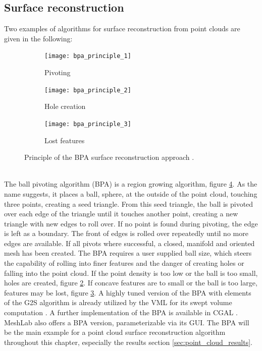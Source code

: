 \subsection{Surface reconstruction}
\label{sec:point_cloud_reconstruction}

Two examples of algorithms for surface reconstruction from point clouds are given in the following:

\begin{description}
	\begin{figure}
		\centering
		\begin{subfigure}[b]{0.30\textwidth}
			\centering
			\texttt{[image: bpa\_principle\_1]}
			\caption{
				Pivoting
			}
			\label{fig:bpa_principle_1}
		\end{subfigure}
		\begin{subfigure}[b]{0.30\textwidth}
			\centering
			\texttt{[image: bpa\_principle\_2]}
			\caption{
				Hole creation
			}
			\label{fig:bpa_principle_2}
		\end{subfigure}
		\begin{subfigure}[b]{0.30\textwidth}
			\centering
			\texttt{[image: bpa\_principle\_3]}
			\caption{
				Lost features
			}
			\label{fig:bpa_principle_3}
		\end{subfigure}
		\caption{
			Principle of the BPA surface reconstruction approach \cite{bpa}.
		}
		\label{fig:bpa_principle}
	\end{figure}

	\item[Ball pivoting algorithm] \hfill \\
	The ball pivoting algorithm (BPA) is a region growing algorithm, \cf figure \ref{fig:bpa_principle}.
	As the name suggests, it places a ball, \ie sphere, at the outside of the point cloud, touching three points, creating a seed triangle.
	From this seed triangle, the ball is pivoted over each edge of the triangle until it touches another point, creating a new triangle with new edges to roll over.
	If no point is found during pivoting, the edge is left as a boundary.
	The front of edges is rolled over repeatedly until no more edges are available.
	If all pivots where successful, a closed, manifold and oriented mesh has been created.
	The BPA requires a user supplied ball size, which steers the capability of rolling into finer features and the danger of creating holes or falling into the point cloud.
	If the point density is too low or the ball is too small, holes are created, \cf figure \ref{fig:bpa_principle_2}.
	If concave features are to small or the ball is too large, features may be lost, \cf figure \ref{fig:bpa_principle_3}.
	A highly tuned version of the BPA with elements of the G2S algorithm is already utilized by the VML for its swept volume computation \cite{bpa_vml}.
	A further implementation of the BPA is available in CGAL \cite{cgal_bpa}.
	MeshLab also offers a BPA version, parameterizable via its GUI.
	The BPA will be the main example for a point cloud surface reconstruction algorithm throughout this chapter, especially the results section \ref{sec:point_cloud_results}.


\end{description}
